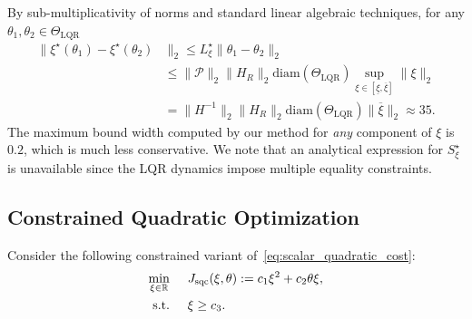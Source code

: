 \documentclass[letterpaper, 10 pt, conference]{ieeeconf}
\newcommand{\R}{\mathbb{R}}
\newcommand{\?}{\stackrel{?}{=}}
\newcommand{\objSqCons}{J_{\mathrm{sqc}}}
\newcommand{\param}{\theta}
\newcommand{\paramSetLQR}{\Theta_{\mathrm{LQR}}}
\newcommand{\var}{\xi}
\newcommand{\varOpt}{\var^\star}
\newcommand{\varOptSet}{S_\var^\star}
\newcommand{\diam}{\text{diam}}
\newcommand{\LQRControlCost}{R}
\newcommand{\SqcQuadScale}{c_1}
\newcommand{\SqcLinScale}{c_2}
\newcommand{\SqcConsVal}{c_3}
\newcommand{\antoine}[1]{{\textcolor[rgb]{1,0,0}{\textsf{[Antoine: {#1}]}}}}
\begin{document}
By sub-multiplicativity of norms and standard linear algebraic techniques, for any $\param_1, \param_2 \in \paramSetLQR$
{
\setlength{\abovedisplayskip}{3.5pt}
\setlength{\belowdisplayskip}{3.5pt}
\begin{align*}
    \lVert \varOpt(\param_1) - \varOpt(\param_2) &\rVert_2 \le L_\varOpt \lVert \param_1 - \param_2 \rVert_2 \\
    & \le \lVert \mathcal{P} \rVert_2 \lVert H_\LQRControlCost \rVert_2 \diam(\paramSetLQR) \textstyle\sup_{\var \in [\underline{\var}, \overline{\var}]} \lVert \var \rVert_2 \\
    & = \lVert H^{-1} \rVert_2 \lVert H_\LQRControlCost \rVert_2 \diam(\paramSetLQR) \lVert \overline{\var} \rVert_2  \approx 35.
\end{align*}
}
\hspace{-1mm}The maximum bound width computed by our method for \emph{any} component of $\var$ is $0.2$, which is much less conservative. 
We note that
an analytical expression for $\varOptSet$ is unavailable 
since the LQR dynamics impose multiple equality constraints.

\subsection{Constrained Quadratic Optimization}
\label{subsec:ex_constrained_quadratic}

Consider the following constrained variant of~\eqref{eq:scalar_quadratic_cost}:
{
\setlength{\abovedisplayskip}{3pt}
\setlength{\belowdisplayskip}{3pt}
\begin{subequations}
\label{eq:scalar_quadratic_constrained_cost}
\begin{align}
    \min_{\var \in \R} \hspace{5mm} & \objSqCons(\var, \param) := \SqcQuadScale \var^2 + \SqcLinScale \param \var, \\
    \text{s.t.} \hspace{5mm} &\var \ge \SqcConsVal.
\end{align}
\end{subequations}
}
\end{document}
